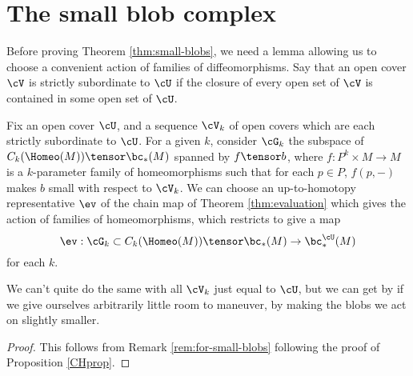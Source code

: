 \section{The small blob complex}
\label{appendix:small-blobs}

Before proving Theorem \ref{thm:small-blobs}, we need a lemma allowing us to choose a convenient action of families of diffeomorphisms.
Say that an open cover $\cV$ is strictly subordinate to $\cU$ if the closure of every open set of $\cV$ is contained in some open set of $\cU$.

\begin{lem}
\label{lem:CH-small-blobs}
Fix an open cover $\cU$, and a sequence $\cV_k$ of open covers which are each strictly subordinate to $\cU$. For a given $k$, consider $\cG_k$ the subspace of $C_k(\Homeo(M)) \tensor \bc_*(M)$ spanned by $f \tensor b$, where $f:P^k \times M \to M$ is a $k$-parameter family of homeomorphisms such that for each $p \in P$, $f(p, -)$ makes $b$ small with respect to $\cV_k$. We can choose an up-to-homotopy representative $\ev$ of the chain map of Theorem \ref{thm:evaluation} which gives the action of families of homeomorphisms, which restricts to give a map
$$\ev : \cG_k \subset C_k(\Homeo(M)) \tensor \bc_*(M) \to \bc^{\cU}_*(M)$$
for each $k$.
\end{lem}
\begin{rem}
We can't quite do the same with all $\cV_k$ just equal to $\cU$, but we can get by if we give ourselves arbitrarily little room to maneuver, by making the blobs we act on slightly smaller.
\end{rem}
\begin{proof}
This follows from Remark \ref{rem:for-small-blobs} following the proof of 
Proposition \ref{CHprop}.
\end{proof}

